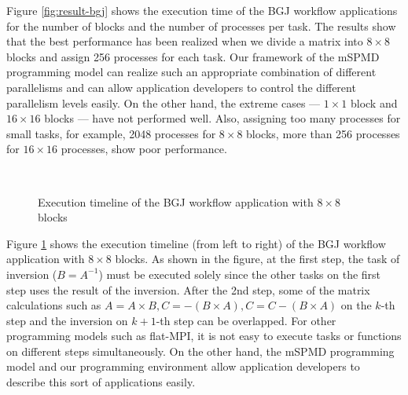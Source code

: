 \documentclass[graybox]{svmult}
\begin{document}
Figure \ref{fig:result-bgj} shows the execution time of the BGJ workflow applications for the number of blocks and the number of  processes per  task. 
The results show that the best performance has been realized when we divide a matrix into $8 \times 8$ blocks and assign 256 processes for each task. 
Our framework of the mSPMD programming model can realize such an appropriate combination of different parallelisms and can allow application developers to control the different parallelism levels easily. 
On the other hand, the extreme cases --- $1 \times 1$ block and $16 \times 16$ blocks --- have not performed well. Also, assigning too many processes for small tasks, for example, 2048 processes for $8 \times 8$ blocks, more than 256 processes for $16 \times 16$ processes, show poor performance. 


\begin{figure}[t]
 \begin{center}
 \end{center}
 \caption{Execution timeline of the BGJ workflow application with $8\times 8$ blocks}
\label{fig:timeline}\
\end{figure}

Figure \ref{fig:timeline} shows the execution timeline (from left to right) of the BGJ workflow application with $8\times 8$ blocks. As shown in the figure, at the first step, the task of inversion ($B=A^{-1}$) must be executed solely since the other tasks on the first step uses the result of the inversion. After the 2nd step, some of the matrix calculations such as $A=A\times B, C=-(B\times A), C=C-(B\times A)$ on the $k$-th step and the inversion on $k+1$-th step can be overlapped. For other programming models such as flat-MPI, it is not easy to execute tasks or functions on different steps simultaneously. On the other hand, the mSPMD programming model and our programming environment allow application developers to describe this sort of applications easily. 
\end{document}
